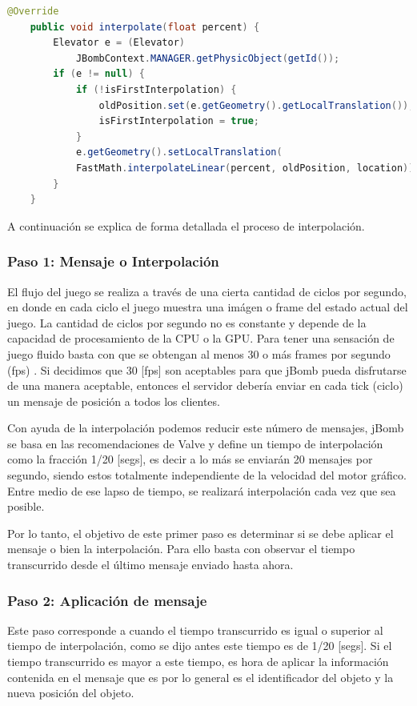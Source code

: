 \documentclass[a4paper,12pt,openany,oneside]{book}
\begin{document}
\newpage
\begin{codigo}
\begin{lstlisting}[language=Java,frame=single,basicstyle=\scriptsize,caption={Interpolación en \textit{ElevatorMovesMessage}}]
	@Override
    public void interpolate(float percent) {
        Elevator e = (Elevator) 
        	JBombContext.MANAGER.getPhysicObject(getId());
        if (e != null) {
            if (!isFirstInterpolation) {
                oldPosition.set(e.getGeometry().getLocalTranslation());
                isFirstInterpolation = true;
            }
            e.getGeometry().setLocalTranslation(
            FastMath.interpolateLinear(percent, oldPosition, location));
        }
    }
\end{lstlisting}
\end{codigo}
A continuación se explica de forma detallada el proceso de interpolación.
\subsubsection{Paso 1: Mensaje o Interpolación}
El flujo del juego se realiza a través de una cierta cantidad de ciclos por segundo, en donde en cada ciclo el juego muestra una imágen o frame del estado actual del juego. La cantidad de ciclos por segundo no es constante y depende de la capacidad de procesamiento de la CPU o la GPU. Para tener una sensación de juego fluido basta con que se obtengan al menos 30 o más frames por segundo (fps) \cite{VALVE1}. Si decidimos que 30 [fps] son aceptables para que jBomb pueda disfrutarse de una manera aceptable, entonces el servidor debería enviar en cada tick (ciclo) un mensaje de posición a todos los clientes.

Con ayuda de la interpolación podemos reducir este número de mensajes, jBomb se basa en las recomendaciones de Valve \cite{VALVE2} y define un tiempo de interpolación como la fracción 1/20 [segs], es decir a lo más se enviarán 20 mensajes por segundo, siendo estos totalmente independiente de la velocidad del motor gráfico. Entre medio de ese lapso de tiempo, se realizará interpolación cada vez que sea posible.

Por lo tanto, el objetivo de este primer paso es determinar si se debe aplicar el mensaje o bien la interpolación. Para ello basta con observar el tiempo transcurrido desde el último mensaje enviado hasta ahora.
\subsubsection{Paso 2: Aplicación de mensaje}
Este paso corresponde a cuando el tiempo transcurrido es igual o superior al tiempo de interpolación, como se dijo antes este tiempo es de 1/20 [segs]. Si el tiempo transcurrido es mayor a este tiempo, es hora de aplicar la información contenida en el mensaje que es por lo general es el identificador del objeto y la nueva posición del objeto.
\end{document}
